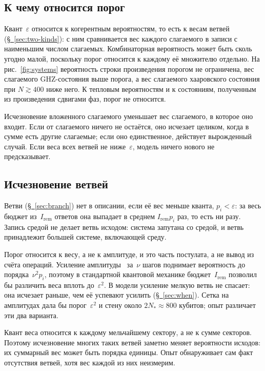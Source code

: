\documentclass[11pt,a4paper]{article}
\newcommand{\Ost}{I_{\mathrm{rem}}}
\begin{document}
\subsection{К чему относится порог}
\label{sec:applies}

Квант~$\varepsilon$ относится к когерентным вероятностям, то есть к весам ветвей (\hyperref[sec:two-kinds]{\S~\ref*{sec:two-kinds}}): с ним сравнивается вес каждого слагаемого в записи с наименьшим числом слагаемых. Комбинаторная вероятность может быть сколь угодно малой, поскольку порог относится к каждому её множителю отдельно. На рис.~\ref{fig:systems} вероятность строки произведения порогом не ограничена, вес слагаемого GHZ-состояния выше порога, а вес слагаемого хааровского состояния при $N\gtrsim400$ ниже него. К тепловым вероятностям и к состояниям, полученным из произведения сдвигами фаз, порог не относится.

Исчезновение вложенного слагаемого уменьшает вес слагаемого, в которое оно входит. Если от слагаемого ничего не остаётся, оно исчезает целиком, когда в сумме есть другие слагаемые; если оно единственное, действует вырожденный случай. Если веса всех ветвей не ниже~$\varepsilon$, модель ничего нового не предсказывает.

\subsection{Исчезновение ветвей}
\label{sec:vanishing}

Ветви (\hyperref[sec:branch]{\S~\ref*{sec:branch}}) нет в описании, если её вес меньше кванта, $p_i<\varepsilon$: за весь бюджет из~$\Ost$ ответов она выпадает в среднем $\Ost p_i$ раз, то есть ни разу. Запись средой не делает ветвь исходом: система запутана со средой, и ветвь принадлежит большей системе, включающей среду.

Порог относится к весу, а не к амплитуде, и это часть постулата, а не вывод из счёта операций. Усиление амплитуды~\cite{grover1996,brassard2002} за~$\nu$ шагов поднимает вероятность до порядка~$\nu^2p_i$, поэтому в стандартной квантовой механике бюджет~$\Ost$ позволил бы различить веса вплоть до~$\varepsilon^2$. В модели усиление мелкую ветвь не спасает: она исчезает раньше, чем её успевают усилить (\hyperref[sec:when]{\S~\ref*{sec:when}}). Сетка на амплитудах дала бы порог~$\varepsilon^2$ и стену около $2N_*\approx800$ кубитов; опыт различает эти два варианта.

Квант веса относится к каждому мельчайшему сектору, а не к сумме секторов. Поэтому исчезновение многих таких ветвей заметно меняет вероятности исходов: их суммарный вес может быть порядка единицы. Опыт обнаруживает сам факт отсутствия ветвей, хотя вес каждой из них неизмерим.
\end{document}
